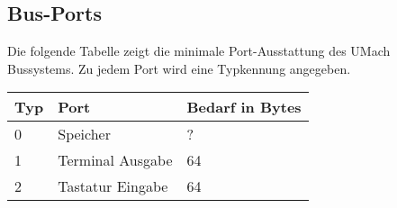 \subsection{Bus-Ports}
\label{subsec:Bus-Ports}

Die folgende Tabelle zeigt die minimale Port-Ausstattung des UMach Bussystems.
Zu jedem Port wird eine Typkennung  angegeben.
\begin{center}
  \begin{tabular}{lll}                         \toprule
    Typ & Port             & Bedarf in Bytes \\\midrule
    0   & Speicher         & ?               \\
    1   & Terminal Ausgabe & 64              \\
    2   & Tastatur Eingabe & 64              \\\bottomrule
  \end{tabular}
\end{center}



